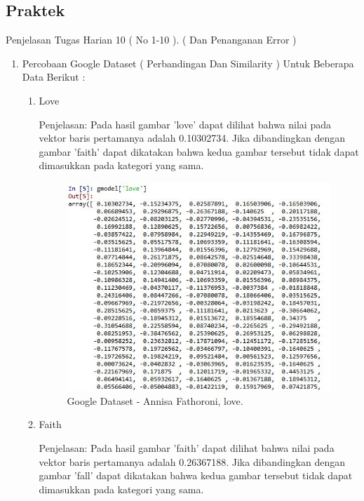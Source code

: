\subsection{Praktek}
Penjelasan Tugas Harian 10 ( No 1-10 ). ( Dan Penanganan Error )
\begin{enumerate}
\item Percobaan Google Dataset ( Perbandingan Dan Similarity ) Untuk Beberapa Data Berikut :
\begin{enumerate}
\item Love

Penjelasan: Pada hasil gambar 'love' dapat dilihat bahwa nilai pada vektor baris pertamanya adalah 0.10302734. Jika dibandingkan dengan gambar 'faith' dapat dikatakan bahwa kedua gambar tersebut tidak dapat dimasukkan pada kategori yang sama.

\begin{figure}[!hbtp]
\centering
\includegraphics[scale=0.7]{figures/Chapter5AnnisaFathoroni12love.jpg}
\caption{Google Dataset - Annisa Fathoroni, love.}
\label{Google Dataset - Annisa Fathoroni, love.}
\end{figure}

\item Faith

Penjelasan: Pada hasil gambar 'faith' dapat dilihat bahwa nilai pada vektor baris pertamanya adalah 0.26367188. Jika dibandingkan dengan gambar 'fall' dapat dikatakan bahwa kedua gambar tersebut tidak dapat dimasukkan pada kategori yang sama.


\end{enumerate}
\end{enumerate}
